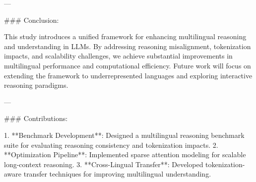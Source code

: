 ---

### Conclusion:

This study introduces a unified framework for enhancing multilingual reasoning and understanding in LLMs. By addressing reasoning misalignment, tokenization impacts, and scalability challenges, we achieve substantial improvements in multilingual performance and computational efficiency. Future work will focus on extending the framework to underrepresented languages and exploring interactive reasoning paradigms.

---

### Contributions:

1. **Benchmark Development**: Designed a multilingual reasoning benchmark suite for evaluating reasoning consistency and tokenization impacts.
2. **Optimization Pipeline**: Implemented sparse attention modeling for scalable long-context reasoning.
3. **Cross-Lingual Transfer**: Developed tokenization-aware transfer techniques for improving multilingual understanding.

